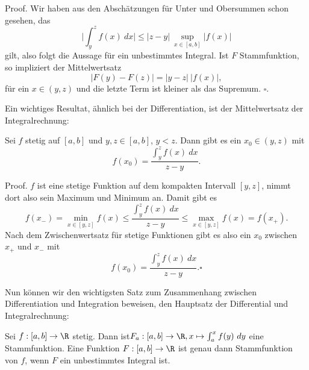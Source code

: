 \documentclass[letterpaper,10pt,english]{jupyterBook}
\begin{document}
\begin{emphBox}{}{}
Proof. Wir haben aus den Abschätzungen für Unter  und Obersummen schon gesehen, das
\begin{equation*}
 \vert \int_y^z f(x)~dx \vert \leq \vert z -y \vert ~\sup_{x \in [a,b]} \vert f(x) \vert
\end{equation*}
gilt, also folgt die Aussage für ein unbestimmtes Integral. Ist \(F\) Stammfunktion, so impliziert der Mittelwertsatz
\begin{equation*}
 \vert F(y) - F(z) \vert = \vert y - z \vert ~\vert f(x) \vert,
\end{equation*}
für ein \(x \in (y,z)\) und die letzte Term ist kleiner als das Supremum. \(\square\).
\end{emphBox}

Ein wichtiges Resultat, ähnlich bei der Differentiation, ist der Mittelwertsatz der Integralrechnung:
\label{integration/hdi:theorem-2}
\begin{theorem}{}{}



Sei \(f\) stetig auf \([a,b]\) und \(y,z \in [a,b]\), \(y < z\). Dann gibt es ein \(x_0 \in (y,z)\) mit
\begin{equation*}
 f(x_0) = \frac{\int_y^z f(x)~dx}{z-y}.
\end{equation*}\end{theorem}

\begin{emphBox}{}{}
Proof. \(f\) ist eine stetige Funktion auf dem kompakten Intervall \([y,z]\), nimmt dort also sein Maximum und Minimum an. Damit gibt es
\begin{equation*}
 f(x_-) = \min_{x \in [y,z]} f(x) \leq \frac{\int_y^z f(x)~dx}{z-y} \leq  \max_{x \in [y,z]} f(x) = f(x_+).
\end{equation*}
Nach dem Zwischenwertsatz für stetige Funktionen gibt es also ein \(x_0\) zwischen \(x_+\) und \(x_-\) mit
\begin{equation*}
 f(x_0) = \frac{\int_y^z f(x)~dx}{z-y}. \square
\end{equation*}\end{emphBox}

Nun können wir den wichtigsten Satz zum Zusammenhang zwischen Differentiation und Integration beweisen, den Hauptsatz der Differential  und Integralrechnung:
\label{integration/hdi:theorem-3}
\begin{theorem}{}{}



Sei \(f:[a,b] \rightarrow \R\) stetig. Dann ist\(F_a: [a,b] \rightarrow \R, x \mapsto \int_a^x f(y)~dy\)
eine Stammfunktion. Eine Funktion \(F:[a,b] \rightarrow \R\) ist genau dann Stammfunktion von \(f\), wenn \(F\) ein unbestimmtes Integral ist.
\end{theorem}
\end{document}
